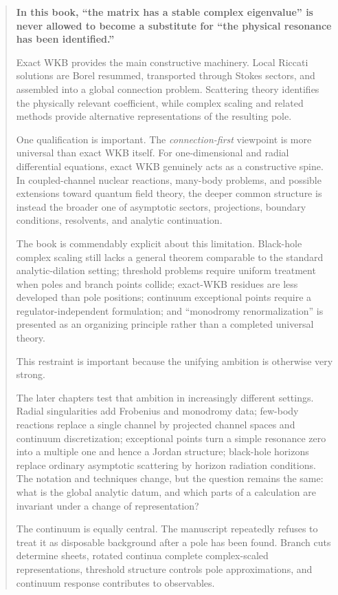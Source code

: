 \begin{quotation}
\begin{center}
\textbf{In this book, ``the matrix has a stable complex eigenvalue'' is never allowed to become a substitute for ``the physical resonance has been identified.''}
\end{center}

Exact WKB provides the main constructive machinery. Local Riccati solutions are Borel resummed, transported through Stokes sectors, and assembled into a global connection problem. Scattering theory identifies the physically relevant coefficient, while complex scaling and related methods provide alternative representations of the resulting pole.

One qualification is important. The \textit{connection-first} viewpoint is more universal than exact WKB itself. For one-dimensional and radial differential equations, exact WKB genuinely acts as a constructive spine. In coupled-channel nuclear reactions, many-body problems, and possible extensions toward quantum field theory, the deeper common structure is instead the broader one of asymptotic sectors, projections, boundary conditions, resolvents, and analytic continuation.

The book is commendably explicit about this limitation. Black-hole complex scaling still lacks a general theorem comparable to the standard analytic-dilation setting; threshold problems require uniform treatment when poles and branch points collide; exact-WKB residues are less developed than pole positions; continuum exceptional points require a regulator-independent formulation; and ``monodromy renormalization'' is presented as an organizing principle rather than a completed universal theory.

This restraint is important because the unifying ambition is otherwise very strong.

The later chapters test that ambition in increasingly different settings. Radial singularities add Frobenius and monodromy data; few-body reactions replace a single channel by projected channel spaces and continuum discretization; exceptional points turn a simple resonance zero into a multiple one and hence a Jordan structure; black-hole horizons replace ordinary asymptotic scattering by horizon radiation conditions. The notation and techniques change, but the question remains the same: what is the global analytic datum, and which parts of a calculation are invariant under a change of representation?

The continuum is equally central. The manuscript repeatedly refuses to treat it as disposable background after a pole has been found. Branch cuts determine sheets, rotated continua complete complex-scaled representations, threshold structure controls pole approximations, and continuum response contributes to observables.


\end{quotation}

